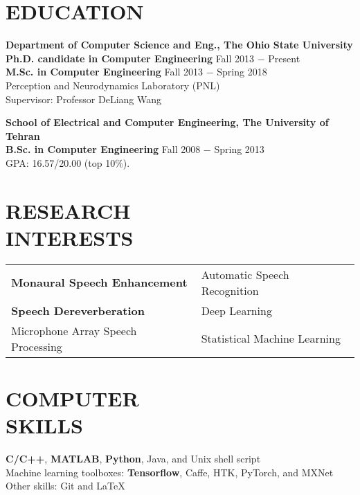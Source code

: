 \documentclass[margin, 10pt]{res}
\begin{document}
\begin{resume}

\section{EDUCATION}
\textbf{Department of Computer Science and Eng., The Ohio State University }  \\
\textbf{Ph.D. candidate in Computer Engineering} \hfill {\footnotesize Fall 2013 $-$ Present} \\
\textbf{M.Sc. in Computer Engineering} \hfill {\footnotesize Fall 2013 $-$ Spring 2018} \\
Perception and Neurodynamics Laboratory (PNL)\\
Supervisor: Professor DeLiang Wang

\textbf{School of Electrical and Computer Engineering, The University of Tehran}\\
\textbf{B.Sc. in Computer Engineering} \hfill {\footnotesize Fall 2008 $-$ Spring 2013} \\
GPA: 16.57/20.00 (top 10\%).


\section{RESEARCH\\INTERESTS}
\begin{tabular}{l l}
\textbf{Monaural Speech Enhancement}    & \hspace{0.3in}   Automatic Speech Recognition\\ 
\textbf{Speech Dereverberation}    & \hspace{0.3in}    Deep Learning\\ 
Microphone Array Speech Processing  & \hspace{0.3in} Statistical Machine Learning
\end{tabular}

\section{COMPUTER \\ SKILLS}
\textbf{C/C++}, \textbf{MATLAB}, \textbf{Python}, Java, and Unix shell script\\
Machine learning toolboxes: \textbf{Tensorflow},
Caffe, HTK, PyTorch, and MXNet\\
Other skills: Git and LaTeX



\end{resume}
\end{document}
